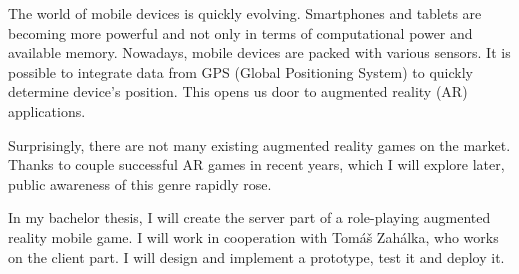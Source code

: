 The world of mobile devices is quickly evolving. Smartphones and tablets are becoming more powerful and not only in terms of computational power and available memory. Nowadays, mobile devices are packed with various sensors. It is possible to integrate data from GPS (Global Positioning System) to quickly determine device’s position. This opens us door to augmented
reality (AR) applications. 

Surprisingly, there are not many existing augmented reality games on the market. Thanks to couple successful AR games in recent years, which I will explore later,  public awareness of this genre rapidly rose.

In my bachelor thesis, I will create the server part of a role-playing augmented reality mobile game. I will work in cooperation with Tomáš Zahálka, who works on the client part. I will design and implement a prototype, test it and deploy it.
